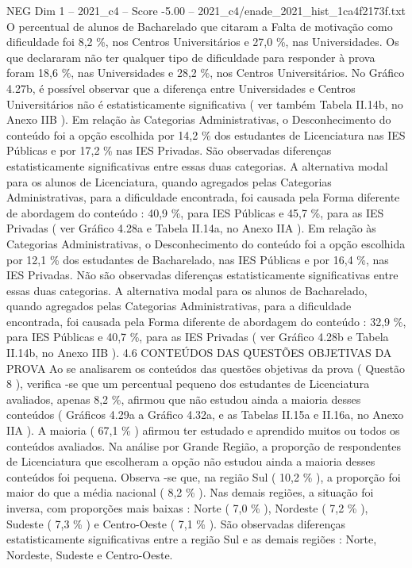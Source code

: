 \begin{textsample}{NEG Dim 1 – 2021\_c4 – Score -5.00 – 2021\_c4/enade\_2021\_hist\_1ca4f2173f.txt}
O percentual de alunos de Bacharelado que citaram a Falta de motivação como dificuldade foi 8,2 \%, nos Centros Universitários e 27,0 \%, nas Universidades.
Os que declararam não ter qualquer tipo de dificuldade para responder à prova foram 18,6 \%, nas Universidades e 28,2 \%, nos Centros Universitários.
No Gráfico 4.27b, é possível observar que a diferença entre Universidades e Centros Universitários não é estatisticamente significativa ( ver também Tabela II.14b, no Anexo IIB ).
Em relação às Categorias Administrativas, o Desconhecimento do conteúdo foi a opção escolhida por 14,2 \% dos estudantes de Licenciatura nas IES Públicas e por 17,2 \% nas IES Privadas.
São observadas diferenças estatisticamente significativas entre essas duas categorias.
A alternativa modal para os alunos de Licenciatura, quando agregados pelas Categorias Administrativas, para a dificuldade encontrada, foi causada pela Forma diferente de abordagem do conteúdo : 40,9 \%, para IES Públicas e 45,7 \%, para as IES Privadas ( ver Gráfico 4.28a e Tabela II.14a, no Anexo IIA ).
Em relação às Categorias Administrativas, o Desconhecimento do conteúdo foi a opção escolhida por 12,1 \% dos estudantes de Bacharelado, nas IES Públicas e por 16,4 \%, nas IES Privadas.
Não são observadas diferenças estatisticamente significativas entre essas duas categorias.
A alternativa modal para os alunos de Bacharelado, quando agregados pelas Categorias Administrativas, para a dificuldade encontrada, foi causada pela Forma diferente de abordagem do conteúdo : 32,9 \%, para IES Públicas e 40,7 \%, para as IES Privadas ( ver Gráfico 4.28b e Tabela II.14b, no Anexo IIB ). 4.6 CONTEÚDOS DAS QUESTÕES OBJETIVAS DA PROVA Ao se analisarem os conteúdos das questões objetivas da prova ( Questão 8 ), verifica -se que um percentual pequeno dos estudantes de Licenciatura avaliados, apenas 8,2 \%, afirmou que não estudou ainda a maioria desses conteúdos ( Gráficos 4.29a a Gráfico 4.32a, e as Tabelas II.15a e II.16a, no Anexo IIA ).
A maioria ( 67,1 \% ) afirmou ter estudado e aprendido muitos ou todos os conteúdos avaliados.
Na análise por Grande Região, a proporção de respondentes de Licenciatura que escolheram a opção não estudou ainda a maioria desses conteúdos foi pequena.
Observa -se que, na região Sul ( 10,2 \% ), a proporção foi maior do que a média nacional ( 8,2 \% ).
Nas demais regiões, a situação foi inversa, com proporções mais baixas : Norte ( 7,0 \% ), Nordeste ( 7,2 \% ), Sudeste ( 7,3 \% ) e Centro-Oeste ( 7,1 \% ).
São observadas diferenças estatisticamente significativas entre a região Sul e as demais regiões : Norte, Nordeste, Sudeste e Centro-Oeste.

\end{textsample}
